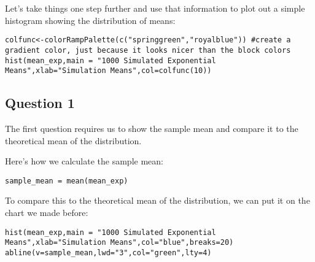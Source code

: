 \documentclass[]{article}
\begin{document}
Let's take things one step further and use that information to plot out
a simple histogram showing the distribution of means:

\begin{verbatim}
colfunc<-colorRampPalette(c("springgreen","royalblue")) #create a gradient color, just because it looks nicer than the block colors
hist(mean_exp,main = "1000 Simulated Exponential Means",xlab="Simulation Means",col=colfunc(10))
\end{verbatim}

\subsection{Question 1}\label{question-1}

The first question requires us to show the sample mean and compare it to
the theoretical mean of the distribution.

Here's how we calculate the sample mean:

\begin{verbatim}
sample_mean = mean(mean_exp)
\end{verbatim}

To compare this to the theoretical mean of the distribution, we can put
it on the chart we made before:

\begin{verbatim}
hist(mean_exp,main = "1000 Simulated Exponential Means",xlab="Simulation Means",col="blue",breaks=20)
abline(v=sample_mean,lwd="3",col="green",lty=4)
\end{verbatim}
\end{document}

